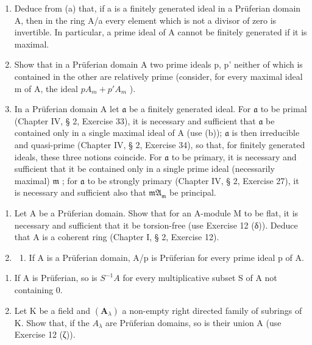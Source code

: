 \begin{enumerate}
\def\labelenumi{(\alph{enumi})}
\setcounter{enumi}{1}
\item
  Deduce from (a) that, if a is a finitely generated ideal in a Prüferian domain A, then in the ring A/a every element which is not a divisor of zero is invertible. In particular, a prime ideal of A cannot be finitely generated if it is maximal.
\item
  Show that in a Prüferian domain A two prime ideals p, p' neither of which is contained in the other are relatively prime (consider, for every maximal ideal m of A, the ideal \(pA_{m} + p'A_{m}\) ).
\item
  In a Prüferian domain A let \(\mathfrak{a}\) be a finitely generated ideal. For \(\mathfrak{a}\) to be primal (Chapter IV, § 2, Exercise 33), it is necessary and sufficient that \(\mathfrak{a}\) be contained only in a single maximal ideal of A (use (b)); \(\mathfrak{a}\) is then irreducible and quasi-prime (Chapter IV, § 2, Exercise 34), so that, for finitely generated ideals, these three notions coincide. For \(\mathfrak{a}\) to be primary, it is necessary and sufficient that it be contained only in a single prime ideal (necessarily maximal) \(\mathfrak{m}\) ; for \(\mathfrak{a}\) to be strongly primary (Chapter IV, § 2, Exercise 27), it is necessary and sufficient also that \(\mathfrak{mA}_{\mathfrak{m}}\) be principal.
\end{enumerate}

\begin{enumerate}
\def\labelenumi{\arabic{enumi}.}
\setcounter{enumi}{13}
\item
  Let A be a Prüferian domain. Show that for an A-module M to be flat, it is necessary and sufficient that it be torsion-free (use Exercise 12 (δ)). Deduce that A is a coherent ring (Chapter I, § 2, Exercise 12).
\item
  \begin{enumerate}
  \def\labelenumii{(\alph{enumii})}
  \tightlist
  \item
    If A is a Prüferian domain, A/p is Prüferian for every prime ideal p of A.
  \end{enumerate}
\end{enumerate}

\begin{enumerate}
\def\labelenumi{(\alph{enumi})}
\setcounter{enumi}{1}
\item
  If A is Prüferian, so is \(S^{-1}A\) for every multiplicative subset S of A not containing 0.
\item
  Let K be a field and \((\mathbf{A}_{\lambda})\) a non-empty right directed family of subrings of K. Show that, if the \(A_{\lambda}\) are Prüferian domains, so is their union A (use Exercise 12 (ζ)).
\end{enumerate}

